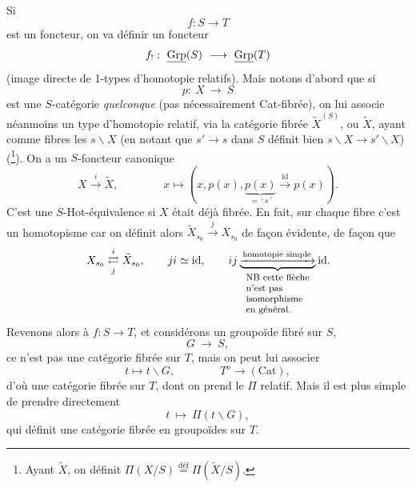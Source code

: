 \clearpage



Si
\[ f : S \longrightarrow T \]
est un foncteur, on va définir un foncteur
\[ f_! :\ \Grp(S) \ \longrightarrow\ \Grp(T) \]
(image directe de 1-types d'homotopie relatifs). Mais notons d'abord que si
\[ p :\ X \ \longrightarrow\ S \]
est une $S$-catégorie \textit{quelconque} (pas nécessairement Cat-fibrée), on lui associe néanmoins un type d'homotopie relatif, via la catégorie fibrée $\tilde{X}^{(S)}$, ou $\tilde{X}$, ayant comme fibres les $s\backslash X$ (en notant que $s' \longrightarrow s$ dans $S$ définit bien $s\backslash X \longrightarrow s'\backslash X$) (\footnote{Ayant $\tilde{X}$, on définit $\Pi(X/S) \overset{\text{déf}}{=} \Pi(\tilde{X}/S)$.}). On a un $S$-foncteur canonique
\[ X \xrightarrow{\ i\ } \tilde{X}, \qquad\qquad x \longmapsto (x, p(x), \underbrace{p(x)}_{=\,\text{‘}\,s\,\text{’}} \xrightarrow{\ \mathrm{id}\ } p(x)). \]
C'est une $S$-Hot-équivalence si $X$ était déjà fibrée. En fait, sur chaque fibre c'est un homotopisme car on définit alors $\tilde{X}_{s_0} \xrightarrow{\ j\ } X_{s_0}$ de façon évidente, de façon que
\[
X_{s_0} \underset{j}{\overset{i}{\rightleftarrows}} \tilde{X}_{s_0}, \qquad ji \simeq \mathrm{id}, \qquad ij \underbrace{\xrightarrow{\text{homotopie simple}}}_{\text{\footnotesize\begin{tabular}{l}NB cette flèche\\ n'est pas \\ isomorphisme\\ en général.\end{tabular}}} \mathrm{id}.
\]
Revenons alors à $f : S \longrightarrow T$, et considérons un groupoïde fibré sur $S$,
\[ G \ \longrightarrow\ S, \]
ce n'est pas une catégorie fibrée sur $T$, mais on peut lui associer
\[ t \longmapsto t\backslash G, \qquad\qquad T^o \longrightarrow (\mathrm{Cat}), \]
d'où une catégorie fibrée sur $T$, dont on prend le $\Pi$ relatif. Mais il est plus simple de prendre directement
\[ t \ \longmapsto\ \Pi(t\backslash G), \]
qui définit une catégorie fibrée en groupoïdes sur $T$.


